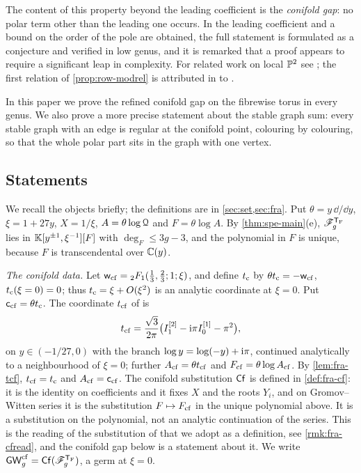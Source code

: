  The content of this property beyond the leading coefficient is the \emph{conifold gap}: no polar term other than the leading one occurs. In \cite{BS} the leading coefficient and a bound on the order of the pole are obtained, the full statement is formulated as a conjecture and verified in low genus, and it is remarked that a proof appears to require a significant leap in complexity. For related work on local $\mathbb{P}^2$ see \cite{LP18,BFGW21,CI18}; the first relation of \cref{prop:row-modrel} is attributed in \cite{BS} to \cite{ZZ08}.  

In this paper we prove the refined conifold gap on the fibrewise torus in every genus. We also prove a more precise statement about the stable graph sum: every stable graph with an edge is regular at the conifold point, colouring by colouring, so that the whole polar part sits in the graph with one vertex.

\subsection{Statements}
\label{sec:int-statements}

We recall the objects briefly; the definitions are in \cref{sec:set,sec:fra}. Put $\theta=y\,\dd/\dd y$, $\xi=1+27y$, $X=1/\xi$, $A=\theta\log\mathcal{Q}$ and $F=\theta\log A$. By \cref{thm:spe-main}(e), $\mathscr{F}_g^{\mathsf{T}_{\mathrm{F}}}$ lies in $\mathbb{K}[y^{\pm1},\xi^{-1}][F]$ with $\deg_F\leq 3g-3$, and the polynomial in $F$ is unique, because $F$ is transcendental over $\mathbb{C}(y)$.

\emph{The conifold data.} Let $\mathsf{w}_{\mathrm{cf}}={}_2F_1(\tfrac13,\tfrac23;1;\xi)$, and define $t_{\mathrm{c}}$ by $\theta t_{\mathrm{c}}=-\mathsf{w}_{\mathrm{cf}}$, $t_{\mathrm{c}}(\xi=0)=0$; thus $t_{\mathrm{c}}=\xi+O(\xi^2)$ is an analytic coordinate at $\xi=0$. Put $\mathsf{c}_{\mathrm{cf}}=\theta t_{\mathrm{c}}$. The coordinate $t_{\mathrm{cf}}$ of \cite{BS} is
\[
t_{\mathrm{cf}}=\frac{\sqrt3}{2\pi}\big(I_1^{[2]}-\mathrm{i}\pi I_0^{[1]}-\pi^2\big),
\]
on $y\in(-1/27,0)$ with the branch $\log y=\log(-y)+\mathrm{i}\pi$, continued analytically to a neighbourhood of $\xi=0$; further $A_{\mathrm{cf}}=\theta t_{\mathrm{cf}}$ and $F_{\mathrm{cf}}=\theta\log A_{\mathrm{cf}}$. By \cref{lem:fra-tcf}, $t_{\mathrm{cf}}=t_{\mathrm{c}}$ and $A_{\mathrm{cf}}=\mathsf{c}_{\mathrm{cf}}$. The conifold substitution $\mathsf{Cf}$ is defined in \cref{def:fra-cf}: it is the identity on coefficients and it fixes $X$ and the roots $Y_i$, and on Gromov--Witten series it is the substitution $F\mapsto F_{\mathrm{cf}}$ in the unique polynomial above. It is a substitution on the polynomial, not an analytic continuation of the series. This is the reading of the substitution of \cite{BS} that we adopt as a definition, see \cref{rmk:fra-cfread}, and the conifold gap below is a statement about it. We write $\mathsf{GW}^{\mathrm{cf}}_g=\mathsf{Cf}(\mathscr{F}_g^{\mathsf{T}_{\mathrm{F}}})$, a germ at $\xi=0$.

